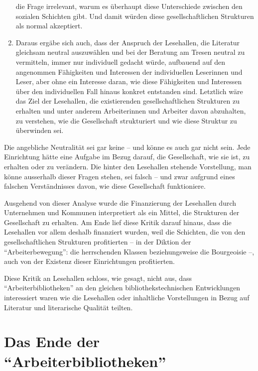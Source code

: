 \documentclass[a4paper,
fontsize=11pt,
oneside,
numbers=noperiodatend,
parskip=half-,
bibliography=totoc,
final
]{scrartcl}
\begin{document}
\begin{enumerate}
  die Frage irrelevant, warum es überhaupt diese Unterschiede zwischen
  den sozialen Schichten gibt. Und damit würden diese gesellschaftlichen
  Strukturen als normal akzeptiert.
\item
  Daraus ergäbe sich auch, dass der Anspruch der Lesehallen, die
  Literatur gleichsam neutral auszuwählen und bei der Beratung am Tresen
  neutral zu vermitteln, immer nur individuell gedacht würde, aufbauend
  auf den angenommen Fähigkeiten und Interessen der individuellen
  Leserinnen und Leser, aber ohne ein Interesse daran, wie diese
  Fähigkeiten und Interessen über den individuellen Fall hinaus konkret
  entstanden sind. Letztlich wäre das Ziel der Lesehallen, die
  existierenden gesellschaftlichen Strukturen zu erhalten und unter
  anderem Arbeiterinnen und Arbeiter davon abzuhalten, zu verstehen, wie
  die Gesellschaft strukturiert und wie diese Struktur zu überwinden
  sei.
\end{enumerate}

Die angebliche Neutralität sei gar keine -- und könne es auch gar nicht
sein. Jede Einrichtung hätte eine Aufgabe im Bezug darauf, die
Gesellschaft, wie sie ist, zu erhalten oder zu verändern. Die hinter den
Lesehallen stehende Vorstellung, man könne ausserhalb dieser Fragen
stehen, sei falsch -- und zwar aufgrund eines falschen Verständnisses
davon, wie diese Gesellschaft funktioniere.

Ausgehend von dieser Analyse wurde die Finanzierung der Lesehallen durch
Unternehmen und Kommunen interpretiert als ein Mittel, die Strukturen
der Gesellschaft zu erhalten. Am Ende lief diese Kritik darauf hinaus,
dass die Lesehallen vor allem deshalb finanziert wurden, weil die
Schichten, die von den gesellschaftlichen Strukturen profitierten -- in
der Diktion der \enquote{Arbeiterbewegung}: die herrschenden Klassen
beziehungsweise die Bourgeoisie --, auch von der Existenz dieser
Einrichtungen profitierten.

Diese Kritik an Lesehallen schloss, wie gesagt, nicht aus, dass
\enquote{Arbeiterbibliotheken} an den gleichen bibliothekstechnischen
Entwicklungen interessiert waren wie die Lesehallen oder inhaltliche
Vorstellungen in Bezug auf Literatur und literarische Qualität teilten.

\hypertarget{das-ende-der-arbeiterbibliotheken}{%
\section{\texorpdfstring{Das Ende der
\enquote{Arbeiterbibliotheken}}{Das Ende der \enquote{Arbeiterbibliotheken}}}\label{das-ende-der-arbeiterbibliotheken}}
\end{document}
